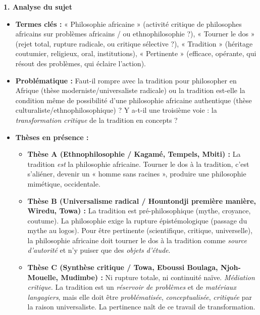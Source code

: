 \documentclass[11pt]{article}
\begin{document}
\begin{exoresolu}
\textbf{1. Analyse du sujet}
\begin{itemize}
    \item \textbf{Termes clés :} « Philosophie africaine » (activité critique de philosophes africains sur problèmes africains / ou ethnophilosophie ?), « Tourner le dos » (rejet total, rupture radicale, ou critique sélective ?), « Tradition » (héritage coutumier, religieux, oral, institutions), « Pertinente » (efficace, opérante, qui résout des problèmes, qui éclaire l'action).
    \item \textbf{Problématique :} Faut-il rompre avec la tradition pour philosopher en Afrique (thèse moderniste/universaliste radicale) ou la tradition est-elle la condition même de possibilité d'une philosophie africaine authentique (thèse culturaliste/ethnophilosophique) ? Y a-t-il une troisième voie : la \emph{transformation critique} de la tradition en concepts ?
    \item \textbf{Thèses en présence :} 
    \begin{itemize}
        \item \textbf{Thèse A (Ethnophilosophie / Kagamé, Tempels, Mbiti) :} La tradition \emph{est} la philosophie africaine. Tourner le dos à la tradition, c'est s'aliéner, devenir un « homme sans racines », produire une philosophie mimétique, occidentale.
        \item \textbf{Thèse B (Universalisme radical / Hountondji première manière, Wiredu, Towa) :} La tradition est pré-philosophique (mythe, croyance, coutume). La philosophie exige la rupture épistémologique (passage du mythe au logos). Pour être pertinente (scientifique, critique, universelle), la philosophie africaine doit tourner le dos à la tradition comme \emph{source d'autorité} et n'y puiser que des \emph{objets d'étude}.
        \item \textbf{Thèse C (Synthèse critique / Towa, Eboussi Boulaga, Njoh-Mouelle, Mudimbe) :} Ni rupture totale, ni continuité naïve. \emph{Médiation critique.} La tradition est un \emph{réservoir de problèmes} et de \emph{matériaux langagiers}, mais elle doit être \emph{problématisée}, \emph{conceptualisée}, \emph{critiquée} par la raison universaliste. La pertinence naît de ce travail de transformation.
    \end{itemize}
\end{itemize}


\end{exoresolu}
\end{document}
